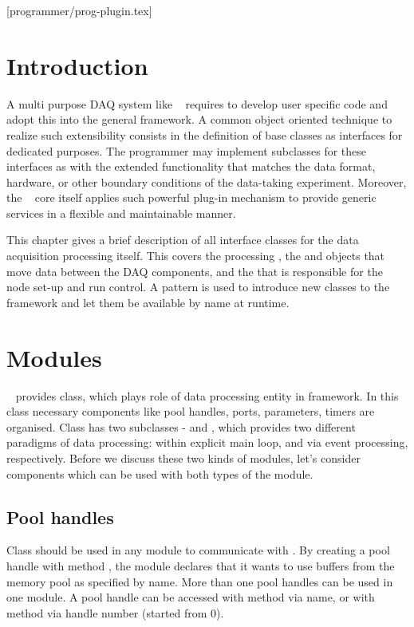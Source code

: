 [programmer/prog-plugin.tex]
\section{Introduction}
A multi purpose DAQ system like \dabc~ requires to develop user specific code and adopt
this into the general framework. A common object oriented technique to realize such
extensibility consists in the definition of base classes as interfaces for dedicated purposes.
The programmer may implement subclasses for these interfaces as 
with the extended functionality that matches the data format, hardware, or other boundary conditions of the
data-taking experiment. Moreover, the  \dabc~ core itself applies such powerful plug-in mechanism to provide 
generic services in a flexible and maintainable manner.   

This chapter gives a brief description of all interface classes for the data acquisition 
processing itself. This covers the processing , the  and 
 objects that move data between the DAQ components, 
and the  that is responsible for the node set-up and run control.
A  pattern is used to introduce new classes to the framework and let them
be available by name at runtime.


\section{Modules}

\dabc~ provides  class, which plays role of data processing entity in framework. 
In this class necessary components like pool handles, ports, parameters, timers are organised.
Class  has two subclasses -  and ,
which provides two different paradigms of data processing: 
within explicit main loop, and via event processing, respectively.
Before we discuss these two kinds of modules, 
let's consider components which can be used with both types of the module.


\subsection{Pool handles}

Class  should be used in any module 
to communicate with .
By creating a pool handle with method , 
the module declares that it 
wants to use buffers from the memory pool as specified by name. 
More than one pool handles can be used in one module. 
A pool handle can be accessed with method  via name,
or with method  via handle number (started from 0).


